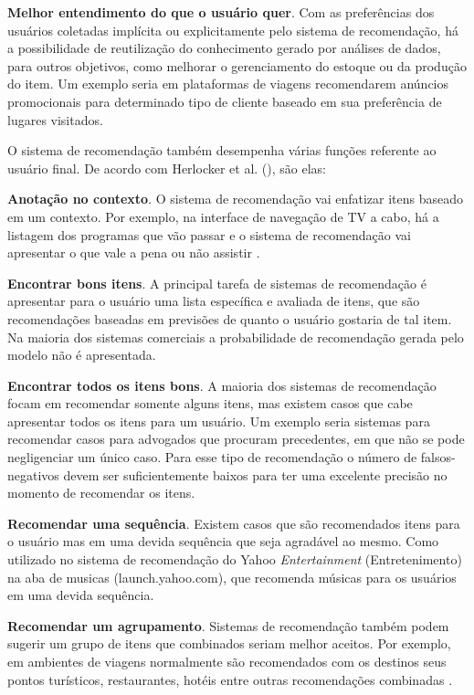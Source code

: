\textbf{Melhor entendimento do que o usuário quer}. Com as preferências dos usuários coletadas implícita ou explicitamente pelo sistema de recomendação, há a possibilidade de reutilização do conhecimento gerado por análises de dados, para outros objetivos, como melhorar o gerenciamento do estoque ou da produção do item. Um exemplo seria em plataformas de viagens recomendarem anúncios promocionais para determinado tipo de cliente baseado em sua preferência de lugares visitados.

O sistema de recomendação também desempenha várias funções referente ao usuário final. De acordo com Herlocker et al. (\citeyear{Herlocker:2004}), são elas:

\textbf{Anotação no contexto}. O sistema de recomendação vai enfatizar itens baseado em um contexto. Por exemplo, na interface de navegação de TV a cabo, há a listagem dos programas que vão passar e o sistema de recomendação vai apresentar o que vale a pena ou não assistir \cite{Ricci:2010}.

\textbf{Encontrar bons itens}. A principal tarefa de sistemas de recomendação é apresentar para o usuário uma lista específica e avaliada de itens, que são recomendações baseadas em previsões de quanto o usuário gostaria de tal item. Na maioria dos sistemas comerciais a probabilidade de recomendação gerada pelo modelo não é apresentada.

\textbf{Encontrar todos os itens bons}. A maioria dos sistemas de recomendação focam em recomendar somente alguns itens, mas existem casos que cabe apresentar todos os itens para um usuário. Um exemplo seria sistemas para recomendar casos para advogados que procuram precedentes, em que não se pode negligenciar um único caso. Para esse tipo de recomendação o número de falsos-negativos devem ser suficientemente baixos para ter uma excelente precisão no momento de recomendar os itens.

\textbf{Recomendar uma sequência}. Existem casos que são recomendados itens para o usuário mas em uma devida sequência que seja agradável ao mesmo. Como utilizado no sistema de recomendação do Yahoo \textit{Entertainment} (Entretenimento) na aba de musicas (launch.yahoo.com), que recomenda músicas para os usuários em uma devida sequência.

\textbf{Recomendar um agrupamento}. Sistemas de recomendação também podem sugerir um grupo de itens que combinados seriam melhor aceitos. Por exemplo, em ambientes de viagens normalmente são recomendados com os destinos seus pontos turísticos, restaurantes, hotéis entre outras recomendações combinadas \cite{Ricci:2010}.

